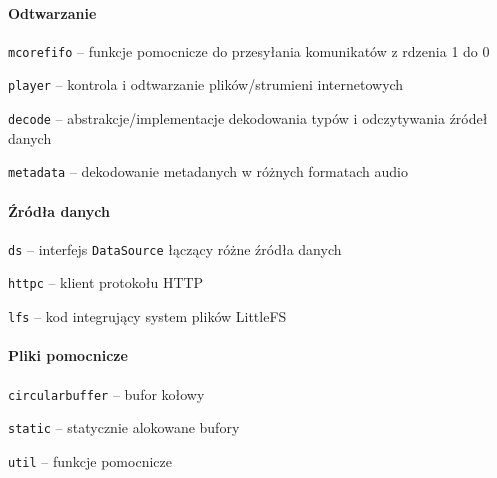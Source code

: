 \documentclass[12pt]{report}
\let\tempone\itemize
\let\temptwo\enditemize
\renewenvironment{itemize}{\tempone\setlength{\itemsep}{0cm}}{\temptwo}
\begin{document}
	\paragraph{Odtwarzanie}
	\begin{itemize}
		\item \lstinline|mcorefifo| -- funkcje pomocnicze do przesyłania komunikatów z rdzenia 1 do 0
		\item \lstinline|player| -- kontrola i odtwarzanie plików/strumieni internetowych
		\begin{itemize}
			\item \lstinline|decode| -- abstrakcje/implementacje dekodowania typów i odczytywania źródeł danych
			\item \lstinline|metadata| -- dekodowanie metadanych w różnych formatach audio
		\end{itemize}
	\end{itemize}

	\paragraph{Źródła danych}
	\begin{itemize}
		\item \lstinline|ds| -- interfejs \lstinline|DataSource| łączący różne źródła danych
		\item \lstinline|httpc| -- klient protokołu HTTP
		\item \lstinline|lfs| -- kod integrujący system plików LittleFS\textsuperscript{\cite{littlefs}}
	\end{itemize}

	\paragraph{Pliki pomocnicze}
	\begin{itemize}
		\item \lstinline|circularbuffer| -- bufor kołowy
		\item \lstinline|static| -- statycznie alokowane bufory
		\item \lstinline|util| -- funkcje pomocnicze
	\end{itemize}
\end{document}
